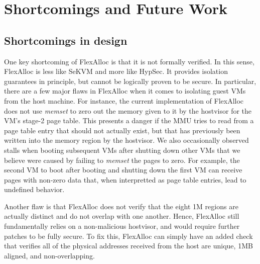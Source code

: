 % 

\section{Shortcomings and Future Work}

\subsection{Shortcomings in design}

One key shortcoming of FlexAlloc is that it is not formally verified. In
this sense, FlexAlloc is less like SeKVM and more like HypSec. It provides isolation guarantees
in principle, but cannot be logically proven to be secure. In particular, there
are a few major flaws in FlexAlloc when it comes to isolating guest VMs from
the host machine. For instance, the current implementation of FlexAlloc
does not use \textit{memset} to zero out the memory given to it by the hostvisor
for the VM's stage-2 page table. This presents a danger if the MMU tries to
read from a page table entry that should not actually exist, but that has
previously been written into the memory region by the hostvisor. We also occasionally
observed stalls when booting subsequent VMs after shutting down other VMs that we
believe were caused by failing to \textit{memset} the pages to zero. For example, the second
VM to boot after booting and shutting down the first VM can receive pages with non-zero data
that, when interpretted as page table entries, lead to undefined behavior.

Another flaw is that
FlexAlloc does not verify that the eight 1M regions are actually distinct and
do not overlap with one another. Hence, FlexAlloc still fundamentally relies on
a non-malicious hostvisor, and would require further patches to be fully secure.
To fix this, FlexAlloc can simply have an added check that verifies all of the
physical addresses received from the host are unique, 1MB aligned, and non-overlapping.

